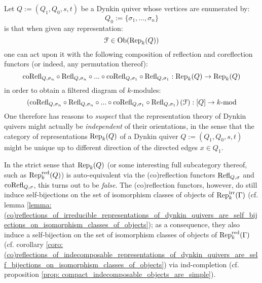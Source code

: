             \begin{remark} \label{remark: dynkin_quivers_are_unique_up_to_orientations}
                Let $Q := (Q_1, Q_0, s, t)$ be a Dynkin quiver whose vertices are enumerated by:
                    $$Q_0 := \{\sigma_1, ..., \sigma_n\}$$
                is that when given any representation:
                    $$\mathcal{F} \in \mathrm{Ob}(\mathrm{Rep}_k(Q))$$
                one can act upon it with the following composition of reflection and coreflection functors (or indeed, any permutation thereof):
                    $$\mathrm{co}\mathrm{Refl}_{Q, \sigma_n} \circ \mathrm{Refl}_{Q, \sigma_n} \circ ... \circ \mathrm{co}\mathrm{Refl}_{Q, \sigma_1} \circ \mathrm{Refl}_{Q, \sigma_1}: \mathrm{Rep}_k(Q) \to \mathrm{Rep}_k(Q)$$
                in order to obtain a filtered diagram of $k$-modules:
                    $$\left(\mathrm{co}\mathrm{Refl}_{Q, \sigma_n} \circ \mathrm{Refl}_{Q, \sigma_n} \circ ... \circ \mathrm{co}\mathrm{Refl}_{Q, \sigma_1} \circ \mathrm{Refl}_{Q, \sigma_1}\right)(\mathcal{F}): [Q] \to k\text{-}\mathrm{mod}$$
                One therefore has reasons to \textit{suspect} that the representation theory of Dynkin quivers might actually be \textit{independent} of their orientations, in the sense that the category of representations $\mathrm{Rep}_k(Q)$ of a Dynkin quiver $Q := (Q_1, Q_0, s, t)$ might be unique up to different direction of the directed edges $x \in Q_1$.
                
                In the strict sense that $\mathrm{Rep}_k(Q)$ (or some interesting full subcategory thereof, such as $\mathrm{Rep}_k^{\mathrm{red}}(Q)$) is auto-equivalent via the (co)reflection functors $\mathrm{Refl}_{Q, \sigma}$ and $\mathrm{co}\mathrm{Refl}_{Q, \sigma}$, this turns out to be \textit{false}. The (co)reflection functors, however, do still induce self-bijections on the set of isomorphism classes of objects of $\mathrm{Rep}_k^{\mathrm{irr}}(\Gamma)$ (cf. lemma \ref{lemma: (co)reflections_of_irreducible_representations_of_dynkin_quivers_are_self_bijections_on_isomorphism_classes_of_objects}); as a consequence, they also induce a self-bijection on the set of isomorphism classes of objects of $\mathrm{Rep}_k^{\mathrm{red}}(\Gamma)$ (cf. corollary \ref{coro: (co)reflections_of_indecomposable_representations_of_dynkin_quivers_are_self_bijections_on_isomorphism_classes_of_objects}) via ind-completion (cf. proposition \ref{prop: compact_indecomposable_objects_are_simple}).
            \end{remark}

